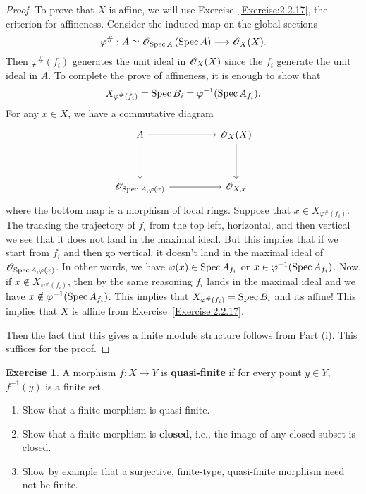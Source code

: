 \documentclass[]{pcmi}
\theoremstyle{plain}
\theoremstyle{definition}
\newtheorem{Exercise}[subsubsection]{Exercise}
\theoremstyle{remark}
\begin{document}
\begin{proof}
    To prove that $X$ is affine, we will use Exercise~\ref{Exercise:2.2.17}, the criterion for affineness. Consider the induced map on the global sections 
    \[
        \varphi^{\#} : A \simeq \mathscr{O}_{\operatorname{Spec} A}\left ( \operatorname{Spec} A \right ) \longrightarrow \mathscr{O}_X(X). 
    \]
    Then $\varphi^{\#}(f_i)$ generates the unit ideal in $\mathscr{O}_X(X)$ since the $f_i$ generate the unit ideal in $A$. To complete the prove of affineness, it is enough to show that 
    \[  
        X_{\varphi^{\#}(f_i)} = \operatorname{Spec} B_i = \varphi^{-1}(\operatorname{Spec} A_{f_i}).
    \] 
    For any $x \in X$, we have a commutative diagram 
    \[
        \begin{tikzcd}
            A && {\mathscr{O}_X(X)} \\
            \\
            {\mathscr{O}_{\text{Spec } A, \varphi(x)}} && {\mathscr{O}_{X, x}}
            \arrow[from=1-1, to=1-3]
            \arrow[from=1-1, to=3-1]
            \arrow[from=1-3, to=3-3]
            \arrow[from=3-1, to=3-3]
        \end{tikzcd}
    \]
    where the bottom map is a morphism of local rings. Suppose that $x \in X_{\varphi^{\#}(f_i)}$. The tracking the trajectory of $f_i$ from the top left, horizontal, and then vertical we see that it does not land in the maximal ideal. But this implies that if we start from $f_i$ and then go vertical, it doesn't land in the maximal ideal of $\mathscr{O}_{\operatorname{Spec} A, \varphi(x)}$. In other words, we have $\varphi(x) \in \operatorname{Spec} A_{f_i}$ or $x \in \varphi^{-1}(\operatorname{Spec} A_{f_i})$. Now, if $x \notin X_{\varphi^{\#}(f_i)}$, then by the same reasoning $f_i$ lands in the maximal ideal and we have $x \notin \varphi^{-1}(\operatorname{Spec} A_{f_i})$. This implies that $X_{\varphi^{\#}(f_i)} = \operatorname{Spec} B_i$ and its affine! This implies that $X$ is affine from Exercise~\ref{Exercise:2.2.17}. 

    Then the fact that this gives a finite module structure follows from Part (i). This suffices for the proof. 
\end{proof}

\begin{Exercise}
    A morphism $f : X \to Y$ is \textbf{quasi-finite} if for every point $y \in Y$, $f^{-1}(y)$ is a finite set. 
    \begin{enumerate}[label = (\alph*)]
        \item Show that a finite morphism is quasi-finite. 
        \item Show that a finite morphism is \textbf{closed}, i.e., the image of any closed subset is closed. 
        \item Show by example that a surjective, finite-type, quasi-finite morphism need not be finite. 
    \end{enumerate}
\end{Exercise}
\end{document}
